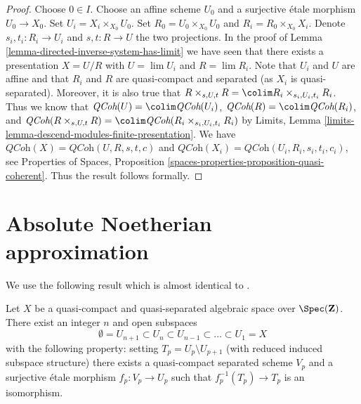 \begin{proof}
Choose $0 \in I$. Choose an affine scheme $U_0$ and a surjective
\'etale morphism $U_0 \to X_0$. Set $U_i = X_i \times_{X_0} U_0$.
Set $R_0 = U_0 \times_{X_0} U_0$ and $R_i = R_0 \times_{X_0} X_i$.
Denote $s_i, t_i : R_i \to U_i$ and $s, t : R \to U$ the two
projections. In the proof of
Lemma \ref{lemma-directed-inverse-system-has-limit} we have
seen that there exists a presentation $X = U/R$ with
$U = \lim U_i$ and $R = \lim R_i$. Note that $U_i$ and $U$ are affine and
that $R_i$ and $R$ are quasi-compact and separated (as $X_i$ is
quasi-separated). Moreover, it is also true that
$R \times_{s, U, t} R = \colim R_i \times_{s_i, U_i, t_i} R_i$.
Thus we know that $\textit{QCoh}(U) = \colim \textit{QCoh}(U_i)$,
$\textit{QCoh}(R) = \colim \textit{QCoh}(R_i)$, and
$\textit{QCoh}(R \times_{s, U, t} R) = \colim
\textit{QCoh}(R_i \times_{s_i, U_i, t_i} R_i)$ by
Limits, Lemma \ref{limits-lemma-descend-modules-finite-presentation}.
We have $\textit{QCoh}(X) = \textit{QCoh}(U, R, s, t, c)$ and
$\textit{QCoh}(X_i) = \textit{QCoh}(U_i, R_i, s_i, t_i, c_i)$, see
Properties of Spaces, Proposition
\ref{spaces-properties-proposition-quasi-coherent}.
Thus the result follows formally.
\end{proof}














\section{Absolute Noetherian approximation}
\label{section-approximation}

\noindent
We use the following result which is almost identical to
\cite[Proposition 5.7.8]{GruRay}.

\begin{lemma}
\label{lemma-filter-quasi-compact-quasi-separated}
Let $X$ be a quasi-compact and quasi-separated algebraic space over
$\Spec(\mathbf{Z})$. There exist an integer $n$ and open subspaces
$$
\emptyset = U_{n + 1} \subset
U_n \subset U_{n - 1} \subset \ldots \subset U_1 = X
$$
with the following property: setting $T_p = U_p \setminus U_{p + 1}$
(with reduced induced subspace structure) there exists a quasi-compact
separated scheme $V_p$ and a surjective \'etale morphism $f_p : V_p \to U_p$
such that $f_p^{-1}(T_p) \to T_p$ is an isomorphism.
\end{lemma}

